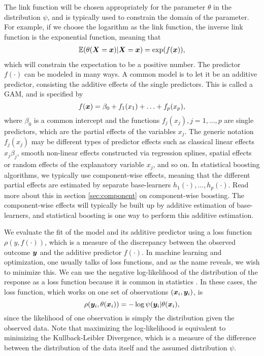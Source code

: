The link function will be chosen appropriately for the parameter $\theta$ in the distribution $\psi$, and is typically used to constrain the domain of the parameter.
For example, if we choose the logarithm as the link function, the inverse link function is the exponential function, meaning that
\begin{align}
    \mathbb{E}(\theta(\bm{X}=\bm{x})|\bm{X}=\bm{x})=\exp(f(\bm{x})),
\end{align}
which will constrain the expectation to be a positive number.
The predictor $f(\cdot)$ can be modeled in many ways.
A common model is to let it be an additive predictor, consisting the additive effects of the single predictors.
This is called a GAM, and is specified by
\begin{equation}\label{eq:gam}
    f(\bm{x})=\beta_0+f_1(x_1)+\ldots+f_p(x_p),
\end{equation}
where $\beta_0$ is a common intercept and the functions $f_j(x_j),j=1,\ldots,p$ are single predictors, which are the partial effects of the variables $x_j$.
The generic notation $f_j(x_j)$ may be different types of predictor effects such as classical linear effects $x_j\beta_j$, smooth non-linear effects constructed via regression splines, spatial effects or random effects of the explanatory variable $x_j$, and so on.%
In statistical boosting algorithms, we typically use component-wise effects, meaning that the different partial effects are estimated by separate base-learners $h_1(\cdot),\ldots,h_p(\cdot)$. Read more about this in section \ref{sec:component} on component-wise boosting. The component-wise effects will typically be built up by additive estimation of base-learners, and statistical boosting is one way to perform this additive estimation.

We evaluate the fit of the model and its additive predictor using a loss function $\rho(y,f(\cdot))$, which is a measure of the discrepancy between the observed outcome $\bm{y}$ and the additive predictor $f(\cdot)$.
In machine learning and optimization, one usually talks of loss functions, and as the name reveals, we wish to minimize this.
We can use the negative log-likelihood of the distribution of the response as a loss function because it is common in statistics \citep{mayr14a}. In these cases, the loss function, which works on one set of observations $(\bm{x}_i,\bm{y}_i)$, is
\begin{equation*}
    \rho(\bm{y}_i,\theta(\bm{x}_i))=-\log{\psi(\bm{y}_i|\theta(\bm{x}_i)},
\end{equation*}
since the likelihood of one observation is simply the distribution given the observed data.
Note that maximizing the log-likelihood is equivalent to minimizing the Kullback-Leibler Divergence, which is a measure of the difference between the distribution of the data itself and the assumed distribution $\psi$.

